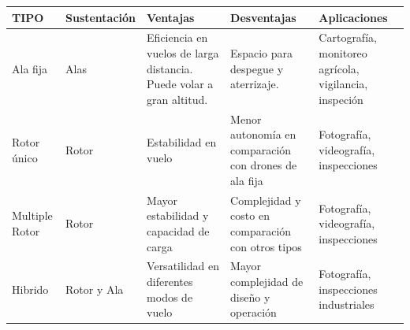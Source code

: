 \documentclass{article}
\begin{document}
\begin{table}
  
  \begin{center}
    \begin{tabular}{| l | l | p{5cm} | p{5cm} | p{5cm} |}
      \hline
      TIPO & Sustentación & Ventajas & Desventajas & Aplicaciones \\ \hline
      Ala fija & Alas & Eficiencia en vuelos de larga distancia. Puede volar a gran altitud. & Espacio para despegue y aterrizaje. & Cartografía, monitoreo agrícola, vigilancia, inspeción \\ \hline
      Rotor único & Rotor & Estabilidad en vuelo & Menor autonomía en comparación con drones de ala fija & Fotografía, videografía, inspecciones \\ \hline
      Multiple Rotor & Rotor & Mayor estabilidad y capacidad de carga & Complejidad y costo en comparación con otros tipos & Fotografía, videografía, inspecciones \\ \hline
      Hibrido & Rotor y Ala & Versatilidad en diferentes modos de vuelo & Mayor complejidad de diseño y operación & Fotografía, inspecciones industriales \\
      \hline
    \end{tabular}
  \end{center}
  
\end{table}
\end{document}

